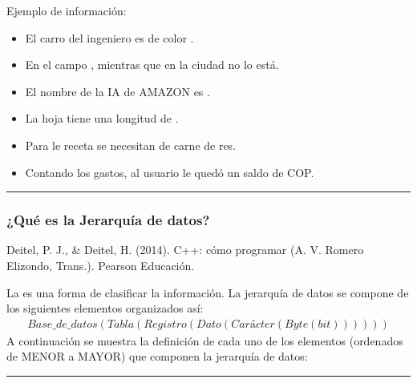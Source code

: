 \documentclass[letterpaper,10pt,spanish]{sphinxmanual}
\begin{document}
\sphinxAtStartPar
Ejemplo de información:
\begin{itemize}
\item {} 
\sphinxAtStartPar
El carro del ingeniero es de color .

\item {} 
\sphinxAtStartPar
En el campo , mientras que en la ciudad no lo está.

\item {} 
\sphinxAtStartPar
El nombre de la IA de AMAZON es .

\item {} 
\sphinxAtStartPar
La hoja tiene una longitud de \sphinxstylestrong{33cm}.

\item {} 
\sphinxAtStartPar
Para le receta se necesitan  de carne de res.

\item {} 
\sphinxAtStartPar
Contando los gastos, al usuario le quedó un saldo de  COP.

\end{itemize}


\bigskip\hrule\bigskip



\subsubsection{¿Qué es la Jerarquía de datos?}
\label{\detokenize{1_guias/8logica/G822:que-es-la-jerarquia-de-datos}}
\sphinxAtStartPar
%
\begin{footnote}[2]\sphinxAtStartFootnote
Deitel, P. J., \& Deitel, H. (2014). C++: cómo programar (A. V. Romero Elizondo, Trans.). Pearson Educación.
%
\end{footnote} La  es una forma de clasificar la información. La jerarquía de datos se compone de los siguientes elementos organizados así:
\begin{equation*}
\begin{split}
Base\_de\_datos(Tabla(Registro(Dato(Carácter(Byte(bit))))))
\end{split}
\end{equation*}
\sphinxAtStartPar
A continuación se muestra la definición de cada uno de los elementos (ordenados de MENOR a MAYOR) que componen la jerarquía de datos:


\bigskip\hrule\bigskip
\end{document}
